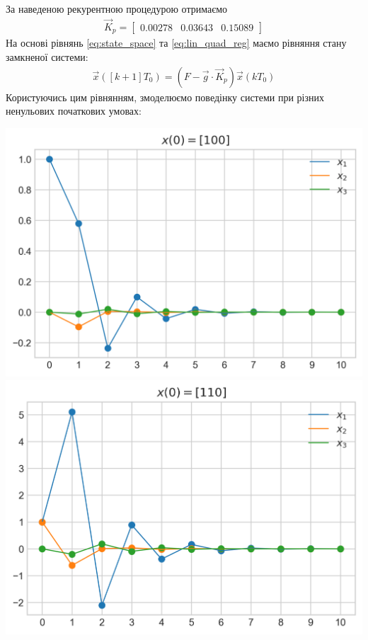 За наведеною рекурентною процедурою отримаємо 
\begin{gather*}
    \vec{K}_p = \begin{bmatrix}
        0.00278 & 0.03643 & 0.15089
    \end{bmatrix}
\end{gather*}
На основі рівнянь \eqref{eq:state_space} та \eqref{eq:lin_quad_reg}
маємо рівняння стану замкненої системи:
\begin{gather*}
    \vec{x}\left([k+1]T_0\right) = \left(F - \vec{g} \cdot \vec{K}_p \right) \vec{x}\left(kT_0\right)
\end{gather*}
Користуючись цим рівнянням, змоделюємо поведінку системи при різних ненульових початкових умовах:
\begin{center}
    \includegraphics[scale=0.9]{pics/lin_quad_model_[1 0 0].png} \\
    \includegraphics[scale=0.9]{pics/lin_quad_model_[1 1 0].png} \\

\end{center}
